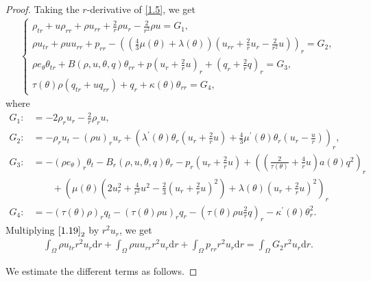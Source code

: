 \documentclass[11pt,reqno]{amsart}
\numberwithin{equation}{section}
\newcommand{\dif}{\mathrm{d}}
\begin{document}
\begin{proof}
 Taking the $r$-derivative of \eqref{1.5}, we get
 \begin{align}\label{1.19}
 \begin{cases}
 \rho_{tr}+u\rho_{rr}+\rho u_{rr}+\frac{2}{r} \rho u_r-\frac{2}{r^2} \rho u =G_1,\\
 \rho u_{tr}+\rho u u_{rr}+p_{rr}-\left((\frac{4}{3} \mu(\theta)+\lambda(\theta))\left(u_{rr}+\frac{2}{r} u_r-\frac{2}{r^2} u\right)\right)_r=G_2,\\
 \rho e_\theta \theta_{tr}+ B(\rho, u, \theta, q) \theta_{rr}+p\left(u_r+\frac{2}{r} u\right)_r+\left(q_r+\frac{2}{r}q\right)_r=G_3,\\
 \tau(\theta) \rho (q_{tr}+ u q_{rr})+q_r+\kappa(\theta) \theta_{rr} =G_4,
 \end{cases}
 \end{align}
 where
 \begin{align*}
 G_1:&=-2\rho_r u_r-\frac{2}{r} \rho_r u,\\
 G_2:&=-\rho_r u_t-(\rho u)_r u_r+ \left(\lambda^\prime(\theta)\theta_r\left(u_r+\frac{2}{r}u\right)+\frac{4}{3}\mu^\prime(\theta) \theta_r\left(u_r-\frac{u}{r}\right)\right)_r,\\
 G_3:&= -(\rho e_\theta)_r \theta_t -B_r(\rho ,u, \theta, q) \theta_r-p_r(u_r+\frac{2}{r} u)+\left( \left(\frac{2}{\tau(\theta)}+\frac{4}{r} u\right) a(\theta) q^2 \right)_r\\
&\qquad  +\left(\mu(\theta)\left( 2u_r^2+\frac{4}{r^2}u^2-\frac{2}{3} \left(u_r+\frac{2}{r} u\right)^2\right)+\lambda(\theta)\left(u_r+\frac{2}{r} u\right)^2\right)_r\\
 G_4:&=-(\tau(\theta) \rho)_r q_t-(\tau(\theta) \rho u)_r q_r- \left( \tau(\theta) \rho u \frac{2}{r} q\right)_r-\kappa^\prime(\theta) \theta_r^2.
 \end{align*}
 Multiplying $\eqref{1.19}_2$ by $r^2 u_r$, we get
 \begin{align}
 \int_{\Omega} \rho u_{tr} r^2 u_r \dif r+ \int_{\Omega} \rho u u_{rr} r^2 u_r \dif r+\int_{\Omega} p_{rr} r^2 u_r\dif r=\int_{\Omega} G_2 r^2 u_r \dif r.
 \end{align}

 We estimate the different terms as follows.


\end{proof}
\end{document}
